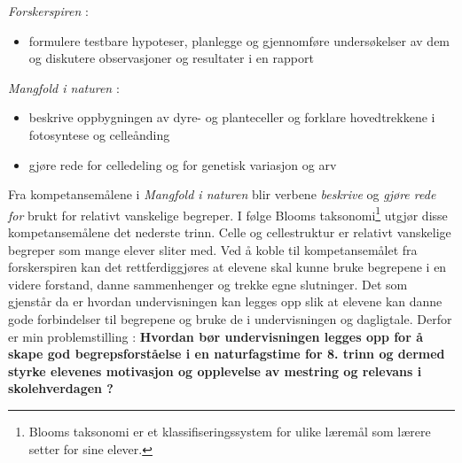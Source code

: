 \documentclass[main.tex]{subfiles}
\begin{document}
\begin{displayquote}
\emph{Forskerspiren} :
\begin{itemize}
\vspace{-2mm}
\item formulere testbare hypoteser, planlegge og gjennomføre undersøkelser 
av dem og diskutere observasjoner og resultater i en rapport
\end{itemize}
\emph{Mangfold i naturen} :
\begin{itemize}
\vspace{-2mm}
\item beskrive oppbygningen av dyre- og planteceller og forklare hovedtrekkene i fotosyntese 
og celleånding
\vspace{-3mm}
\item gjøre rede for celledeling og for genetisk variasjon og arv
\end{itemize}
\end{displayquote} 
Fra kompetansemålene i \emph{Mangfold i naturen} blir verbene \emph{beskrive} og \emph{gjøre rede for} brukt 
for relativt vanskelige begreper. I følge Blooms taksonomi\footnote{Blooms taksonomi er et klassifiseringssystem 
for ulike læremål som lærere setter for sine elever.} utgjør disse kompetansemålene det nederste trinn. 
Celle og cellestruktur er relativt vanskelige begreper som mange elever sliter med. Ved å koble til 
kompetansemålet fra forskerspiren kan det rettferdiggjøres at elevene skal kunne bruke begrepene i en videre forstand, 
danne sammenhenger og trekke egne slutninger. Det som gjenstår da er hvordan undervisningen kan legges opp slik at 
elevene kan danne gode forbindelser til begrepene og bruke de i undervisningen og dagligtale.
\newline
\newline
Derfor er min problemstilling :
\newline
\newline
\textbf{Hvordan bør undervisningen legges opp for å skape god begrepsforståelse i en naturfagstime for 8. trinn 
og dermed styrke elevenes motivasjon og opplevelse av mestring og relevans i skolehverdagen ?}
\end{document}
